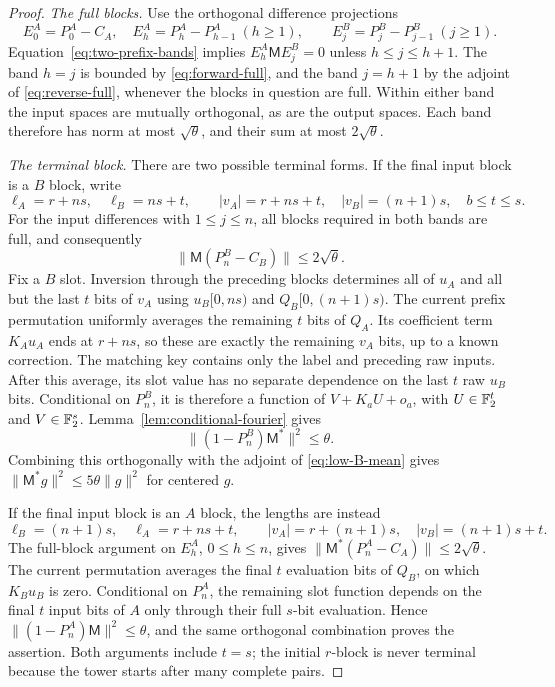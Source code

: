 \begin{proof}
\emph{The full blocks.}
Use the orthogonal difference projections
\[
 E_0^A=P_0^A-C_A,\quad E_h^A=P_h^A-P_{h-1}^A\ (h\geq1),
 \qquad E_j^B=P_j^B-P_{j-1}^B\ (j\geq1).
\]
Equation~\eqref{eq:two-prefix-bands} implies
$E_h^A\mathsf{M}E_j^B=0$ unless $h\leq j\leq h+1$.
The band $h=j$ is bounded by \eqref{eq:forward-full}, and the band
$j=h+1$ by the adjoint of \eqref{eq:reverse-full}, whenever the
blocks in question are full.  Within either band the input spaces
are mutually orthogonal, as are the output spaces.  Each band
therefore has norm at most $\sqrt\theta$, and their sum at most
$2\sqrt\theta$.

\emph{The terminal block.}
There are two possible terminal forms.  If the final input block is
a $B$ block, write
\[
 \ell_A=r+ns,\quad \ell_B=ns+t,\qquad
 |v_A|=r+ns+t,\quad |v_B|=(n+1)s,\quad b\leq t\leq s.
\]
For the input differences with $1\leq j\leq n$, all blocks required
in both bands are full, and consequently
\begin{equation}\label{eq:low-B-mean}
 \|\mathsf{M}(P_n^B-C_B)\|\leq2\sqrt\theta.
\end{equation}
Fix a $B$ slot.  Inversion through the preceding blocks determines
all of $u_A$ and all but the last $t$ bits of $v_A$ using
$u_B[0,ns)$ and $Q_B[0,(n+1)s)$.  The current prefix permutation
uniformly averages the remaining $t$ bits of $Q_A$.  Its coefficient
term $K_Au_A$ ends at $r+ns$, so these are exactly the remaining
$v_A$ bits, up to a known correction.  The matching key contains
only the label and preceding raw inputs.  After this average, its
slot value has no separate dependence on the last $t$ raw $u_B$
bits.  Conditional on $P_n^B$, it is therefore a function of
$V+K_aU+o_a$, with $U\in\mathbb F_2^t$ and $V\in\mathbb F_2^s$.
Lemma~\ref{lem:conditional-fourier} gives
\[
 \|(1-P_n^B)\mathsf{M}^*\|^2\leq\theta.
\]
Combining this orthogonally with the adjoint of
\eqref{eq:low-B-mean} gives $\|\mathsf{M}^*g\|^2\leq5\theta\|g\|^2$
for centered $g$.

If the final input block is an $A$ block, the lengths are instead
\[
 \ell_B=(n+1)s,\quad \ell_A=r+ns+t,\qquad
 |v_A|=r+(n+1)s,\quad |v_B|=(n+1)s+t.
\]
The full-block argument on $E_h^A$, $0\leq h\leq n$, gives
$\|\mathsf{M}^*(P_n^A-C_A)\|\leq2\sqrt\theta$.
The current permutation averages the final $t$ evaluation bits of
$Q_B$, on which $K_Bu_B$ is zero.  Conditional on $P_n^A$, the
remaining slot function depends on the final $t$ input bits of $A$
only through their full $s$-bit evaluation.  Hence
$\|(1-P_n^A)\mathsf{M}\|^2\leq\theta$, and the same orthogonal combination
proves the assertion.  Both arguments include $t=s$; the initial
$r$-block is never terminal because the tower starts after many
complete pairs.


\end{proof}
